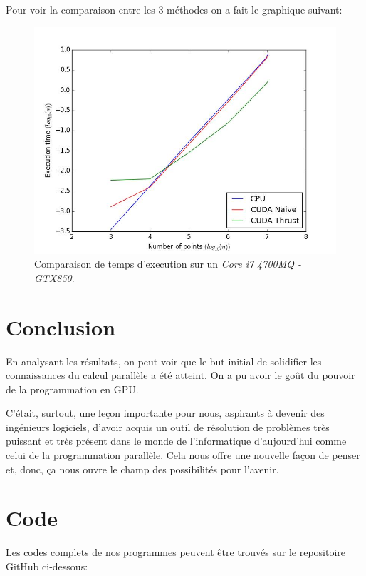 \documentclass[12pt,oneside]{article}
\begin{document}
Pour voir la comparaison entre les 3 méthodes on a fait le graphique suivant:

\begin{figure}[h]
\centering
\includegraphics[width=1.0\textwidth]{comparison.jpg}
\caption{\label{fig:Comparaison}Comparaison de temps d'execution sur un \emph{Core i7 4700MQ - GTX850}.}
\end{figure}


\section{Conclusion}

En analysant les résultats, on peut voir que le but initial de solidifier les connaissances du calcul parallèle a été atteint. On a pu avoir le goût du pouvoir de la programmation en GPU.

C'était, surtout, une leçon importante pour nous, aspirants à devenir des ingénieurs logiciels, d'avoir acquis un outil de résolution de problèmes très puissant et très présent dans le monde de l'informatique d'aujourd'hui comme celui de la programmation parallèle. Cela nous offre une nouvelle façon de penser et, donc, ça nous ouvre le champ des possibilités pour l'avenir.

\section{Code}

Les codes complets de nos programmes peuvent être trouvés sur le repositoire GitHub ci-dessous:
  
\end{document}
